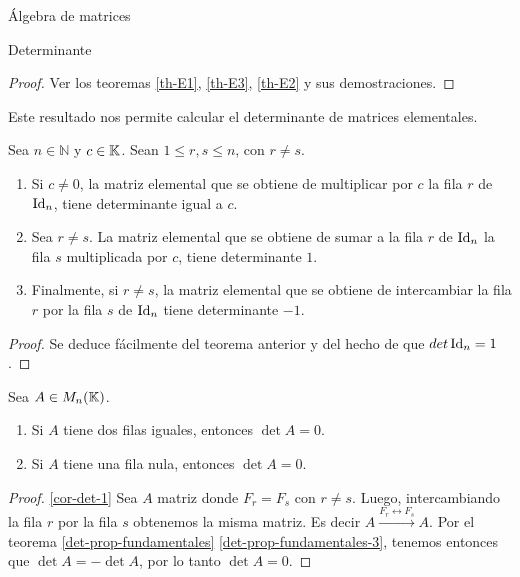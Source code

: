 \begin{chapter}{\'Algebra de matrices}
\begin{section}{Determinante}
\begin{teorema}
\begin{enumerate}
        \end{enumerate}
    \end{teorema}
    \begin{proof}
        Ver  los teoremas \ref{th-E1}, \ref{th-E3}, \ref{th-E2} y  sus demostraciones.
    \end{proof}

    Este resultado nos permite calcular el determinante de matrices elementales.
    
    \begin{corolario}\label{det-mtrx-elem} Sea $n \in \mathbb N$ y $c \in \mathbb K$. Sean $1 \le r,s \le n$,  con $r \ne s$.
        \begin{enumerate}
            \item Si $c \not=0$, la matriz elemental que se obtiene de multiplicar por  $c$ la fila $r$ de $\operatorname{Id}_n$, tiene determinante igual a $c$.
            \item Sea $r \ne s$. La matriz elemental que se obtiene de sumar a la fila $r$ de $\operatorname{Id}_n$  la fila $s$ multiplicada por $c$, tiene determinante $1$.
            \item Finalmente, si $r \ne s$, la matriz elemental que se obtiene de intercambiar la fila $r$ por la fila $s$ de $\operatorname{Id}_n$ tiene determinante $-1$.
        \end{enumerate}    
    \end{corolario} 
    \begin{proof}
        Se deduce fácilmente del teorema anterior y del hecho de que $det \operatorname{Id}_n =1$.            
    \end{proof}
     
    \begin{corolario}\label{det-filas-iguales} Sea $A  \in M_n(\mathbb K)$.
        \begin{enumerate}
            \item\label{cor-det-1} Si $A$ tiene dos filas iguales,  entonces $\det A=0$.
            \item\label{cor-det-2} Si $A$ tiene una fila nula, entonces $\det A =0$.
        \end{enumerate}
    \end{corolario}
    \begin{proof}
        \ref{cor-det-1} Sea $A$ matriz donde $F_r = F_s$ con $r\ne s$. Luego, intercambiando la fila $r$ por la fila $s$ obtenemos la misma matriz. Es decir $A  \stackrel{F_r \leftrightarrow F_s}{\longrightarrow} A$. Por el teorema \ref{det-prop-fundamentales} \ref{det-prop-fundamentales-3}, tenemos entonces que $\det A = - \det A$, por lo tanto  $\det A =0$. 
        

\end{proof}
\end{section}
\end{chapter}
